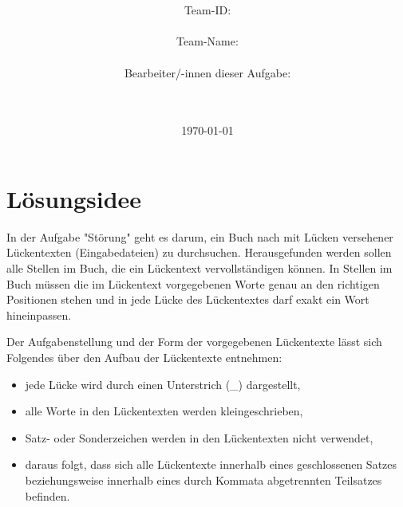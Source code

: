 \documentclass[a4paper,10pt,ngerman]{scrartcl}
\title{\textbf{\Huge\Aufgabe}}
\author{\LARGE Team-ID: \LARGE \TeamId \\\\
\LARGE Team-Name: \LARGE \TeamName \\\\
\LARGE Bearbeiter/-innen dieser Aufgabe: \\
\LARGE \Namen\\\\}
\date{\LARGE\today}
\begin{document}
	\maketitle
	\tableofcontents

    \vspace{0.5cm}

	\section{Lösungsidee}\label{sec:losungsidee}
    	In der Aufgabe "Störung" geht es darum,
    	ein Buch nach mit Lücken versehener Lückentexten (Eingabedateien) zu durchsuchen.
		Herausgefunden werden sollen alle Stellen im Buch,
		die ein Lückentext vervollständigen können.
		In Stellen im Buch müssen die im Lückentext vorgegebenen Worte genau an den richtigen Positionen stehen
		und in jede Lücke des Lückentextes darf exakt ein Wort hineinpassen.

		Der Aufgabenstellung
		und der Form der vorgegebenen Lückentexte lässt sich Folgendes über den Aufbau der Lückentexte entnehmen:
		\begin{itemize}
			\item jede Lücke wird durch einen Unterstrich (\_) dargestellt,
			\item alle Worte in den Lückentexten werden kleingeschrieben,
			\item Satz- oder Sonderzeichen werden in den Lückentexten nicht verwendet,
			\item daraus folgt,
			dass sich alle Lückentexte innerhalb eines geschlossenen Satzes beziehungsweise innerhalb eines durch Kommata abgetrennten Teilsatzes befinden.
		\end{itemize}
\end{document}
